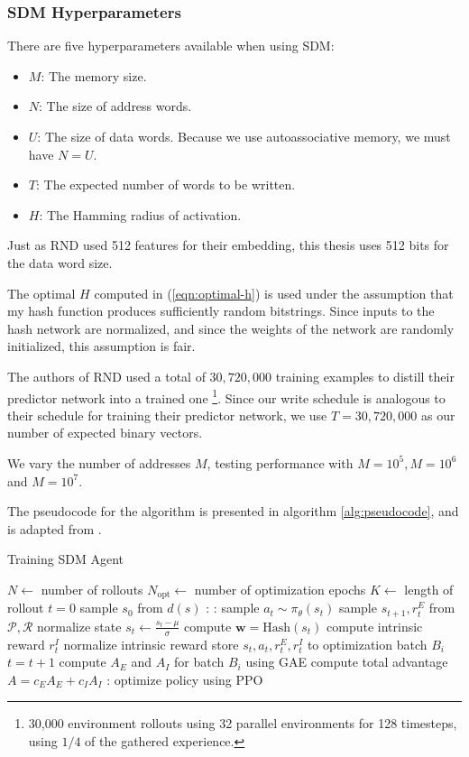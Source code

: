 \documentclass[journal, onecolumn, 12pt, draftclsnofoot]{IEEEtran}
\newcommand{\mc}[1]{\mathcal{#1}}
\newcommand{\mbf}[1]{\mathbf{#1}}
\begin{document}
	\subsubsection{SDM Hyperparameters}
	\par There are five hyperparameters available when using SDM:
	\begin{itemize}
		\item $M$: The memory size.
		\item $N$: The size of address words.
		\item $U$: The size of data words. Because we use autoassociative memory, we must have $N = U$.
		\item $T$: The expected number of words to be written.
		\item $H$: The Hamming radius of activation.
	\end{itemize}
	\par Just as RND used 512 features for their embedding, this thesis uses 512 bits for the data word size.
	\par The optimal $H$ computed in (\ref{eqn:optimal-h}) is used under the assumption that my hash function produces sufficiently random bitstrings. Since inputs to the hash network are normalized, and since the weights of the network are randomly initialized, this assumption is fair.
	\par The authors of RND used a total of $30,720,000$ training examples to distill their predictor network into a trained one \footnote{30,000 environment rollouts using 32 parallel environments for 128 timesteps, using $1/4$ of the gathered experience.}. Since our write schedule is analogous to their schedule for training their predictor network, we use $T = 30,720,000$ as our number of expected binary vectors.
	\par We vary the number of addresses $M$, testing performance with $M=10^5, M=10^6$ and $M=10^7$.
	\par The pseudocode for the algorithm is presented in algorithm \ref{alg:pseudocode}, and is adapted from \cite{rnd}.

	\begin{algorithm}
		\label{alg:pseudocode}
		\caption{Training SDM Agent}
	\begin{algorithmic}
		\State $N \gets$ number of rollouts
		\State $N_\text{opt} \gets$ number of optimization epochs
		\State $K \gets$ length of rollout
		\State $t = 0$
		\State sample $s_0$ from $d(s)$
		:
			:
				\State sample $a_t \sim \pi_\theta(s_t)$
				\State sample $s_{t+1}, r_t^E$ from $\mc{P}, \mc{R}$
				\State normalize state $s_t \gets \frac{s_t - \mu}{\sigma}$
				\State compute $\mbf{w} = \text{Hash}(s_t)$
				\State compute intrinsic reward $r_t^I$
				\State normalize intrinsic reward
				\State store $s_t, a_t, r_t^E, r_t^I$ to optimization batch $B_i$
				\State $t = t+1$
			\EndFor
			\State compute $A_E$ and $A_I$ for batch $B_i$ using GAE
			\State compute total advantage $A = c_E A_E + c_I A_I$
			:
				\State optimize policy using PPO
			\EndFor
		\EndFor
	\end{algorithmic}
\end{algorithm}
\end{document}
